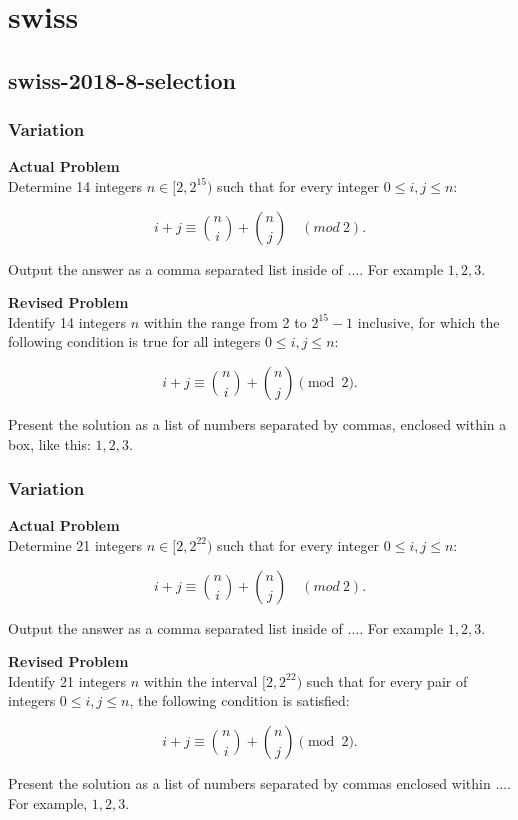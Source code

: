 \section{swiss}
\subsection{swiss-2018-8-selection}
\subsubsection{Variation}
\textbf{Actual Problem}\\
Determine 14 integers $n \in [2, 2^{15})$ such that for every integer $0 \leq i,j \leq n$:

$$i + j \equiv \binom{n}{i} + \binom{n}{j} \quad (mod~2).$$

Output the answer as a comma separated list inside of $\boxed{...}$. For example $\boxed{1, 2, 3}$.

\textbf{Revised Problem}\\
Identify 14 integers \( n \) within the range from 2 to \( 2^{15} - 1 \) inclusive, for which the following condition is true for all integers \( 0 \leq i, j \leq n \):

$$ i + j \equiv \binom{n}{i} + \binom{n}{j} \pmod{2}. $$

Present the solution as a list of numbers separated by commas, enclosed within a box, like this: \(\boxed{1, 2, 3}\).

\subsubsection{Variation}
\textbf{Actual Problem}\\
Determine 21 integers $n \in [2, 2^{22})$ such that for every integer $0 \leq i,j \leq n$:

$$i + j \equiv \binom{n}{i} + \binom{n}{j} \quad (mod~2).$$

Output the answer as a comma separated list inside of $\boxed{...}$. For example $\boxed{1, 2, 3}$.

\textbf{Revised Problem}\\
Identify 21 integers \( n \) within the interval \([2, 2^{22})\) such that for every pair of integers \(0 \leq i, j \leq n\), the following condition is satisfied:

\[
i + j \equiv \binom{n}{i} + \binom{n}{j} \pmod{2}.
\]

Present the solution as a list of numbers separated by commas enclosed within \(\boxed{...}\). For example, \(\boxed{1, 2, 3}\).

